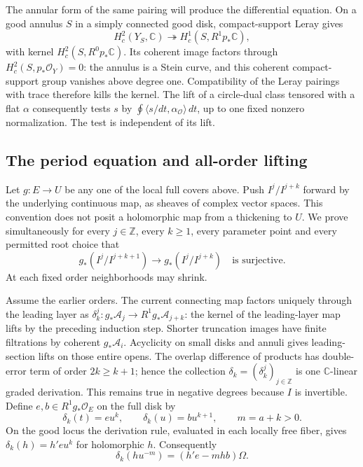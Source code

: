 The annular form of the same pairing will produce the differential
equation.  On a good annulus $S$ in a simply connected good disk, compact-support
Leray gives
\[
 H_c^2(Y_S,\mathbb C)\twoheadrightarrow
 H_c^1(S,R^1p_*\mathbb C),
\]
with kernel $H_c^2(S,R^0p_*\mathbb C)$.  Its coherent image
factors through $H_c^2(S,p_*\mathcal O_Y)=0$: the annulus is a
Stein curve, and this coherent compact-support group vanishes
above degree one.  Compatibility of the Leray pairings with
trace therefore kills the kernel.  The lift of a circle-dual
class tensored with a flat $\alpha$ consequently tests $s$ by
$\oint\langle s/dt,\alpha_{\mathcal O}\rangle\,dt$, up to one
fixed nonzero normalization.  The test is independent of its lift.

\subsection{The period equation and all-order lifting}\label{nu2:subsec:lifting}

Let $g:E\to U$ be any one of the local full covers above.  Push
$I^j/I^{j+k}$ forward by the underlying continuous map, as sheaves
of complex vector spaces.  This convention does not posit a
holomorphic map from a thickening to $U$.  We prove simultaneously
for every $j\in\mathbb Z$, every $k\ge1$, every parameter point
and every permitted root choice that
\begin{equation}\label{nu2:eq:lifting}
 g_*(I^j/I^{j+k+1})\longrightarrow g_*(I^j/I^{j+k})
 \quad\text{is surjective}.
\end{equation}
At each fixed order neighborhoods may shrink.

Assume the earlier orders.  The current connecting map factors
uniquely through the leading layer as
$\delta_k^j:g_*\mathcal A_j\to R^1g_*\mathcal A_{j+k}$:
the kernel of the leading-layer map lifts by the preceding induction
step.  Shorter truncation images have finite filtrations by coherent
$g_*\mathcal A_i$.  Acyclicity on small disks and annuli gives
leading-section lifts on those entire opens.  The overlap difference
of products has double-error term of order $2k\ge k+1$; hence the collection
$\delta_k=(\delta_k^j)_{j\in\mathbb Z}$ is one
$\mathbb C$-linear graded derivation.
This remains true in negative degrees because $I$ is invertible.
Define $e,b\in R^1g_*\mathcal O_E$ on the full disk by
\[
 \delta_k(t)=e u^k,\qquad\delta_k(u)=b u^{k+1},
 \qquad m=a+k>0.
\]
On the good locus the derivation rule, evaluated in each locally
free fiber, gives $\delta_k(h)=h'e u^k$ for holomorphic $h$.
Consequently
\begin{equation}\label{nu2:eq:obstruction}
 \delta_k(hu^{-m})=(h'e-mhb)\Omega.
\end{equation}

